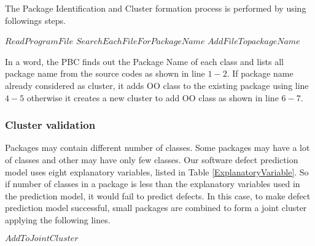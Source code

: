 \documentclass[12pt]{report}
\begin{document}
The Package Identification and Cluster formation process is performed by using followings steps.  
\begin{algorithm}
\label{Package_Identification_and_Cluster_formation}
\begin{algorithmic}[1]

			\STATE $Read Program File$ 
			\STATE $Search Each File For PackageName $  
				\STATE $Add File To packageName$
			\ENDIF
	\ENDFOR
	

\end{algorithmic}
\end{algorithm}
In a word, the PBC finds out the Package Name of each class and lists all package name from the source codes as shown in line $1-2$. If package name already considered as cluster, it adds OO class to the existing package using line $4-5$ otherwise it creates a new cluster to add OO class as shown in line $6-7$.     


\subsubsection{Cluster validation} Packages may contain different number of classes. Some packages may have a lot of classes and other may have only few classes. Our software defect prediction model uses eight explanatory variables, listed in Table \ref{ExplanatoryVariable}. So if number of classes in a package is less than the explanatory variables used in the prediction model, it would fail to predict defects. In this case, to make defect prediction model successful, small packages are combined to form a joint cluster applying the following lines. 

\begin{algorithm}
\label{PackageLevel}
\begin{algorithmic}[1]
	
			\STATE $Add To Joint Cluster$
		\ENDIF
	\ENDFOR
\end{algorithmic}
\end{algorithm}
\end{document}
